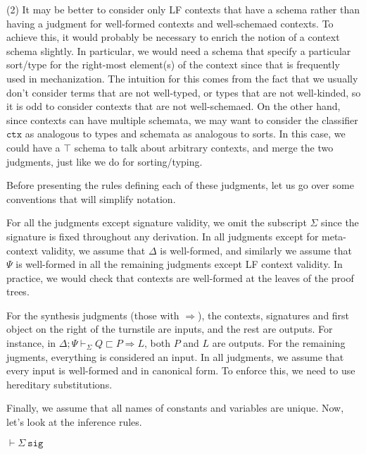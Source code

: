 \documentclass[letterpaper, 11pt]{article}
\newcommand{\Rar}{\Rightarrow}
\newcommand{\sig}{\texttt{sig}}
\begin{document}
    (2) It may be better to consider only LF contexts that have a schema rather than having a judgment for well-formed contexts and well-schemaed contexts.
    To achieve this, it would probably be necessary to enrich the notion of a context schema slightly.  In particular, we would need a schema that
    specify a particular sort/type for the right-most element(s) of the context since that is frequently used in mechanization.  The intuition for this
    comes from the fact that we usually don't consider terms that are not well-typed, or types that are not well-kinded, so it is odd to consider
    contexts that are not well-schemaed.  On the other hand, since contexts can have multiple schemata, we may want to consider the classifier 
    $\texttt{ctx}$ as analogous to types and schemata as analogous to sorts.  In this case, we could have a $\top$ schema to talk about arbitrary contexts,
    and merge the two judgments, just like we do for sorting/typing.

    Before presenting the rules defining each of these judgments, let us go over some conventions that will simplify notation.
    
    For all the judgments except signature validity, we omit the subscript $\Sigma$ since the signature is fixed throughout any derivation.
    In all judgments except for meta-context validity, we assume that $\Delta$ is well-formed, and similarly we assume that $\Psi$ is well-formed 
    in all the remaining judgments except LF context validity.  In practice, we would check that contexts are well-formed at the leaves of
    the proof trees.

    For the synthesis judgments (those with $\Rar$), the contexts, signatures and first object on the right of the turnstile
    are inputs, and the rest are outputs.  For instance, in $ \Delta; \Psi \vdash_\Sigma Q \sqsubset P \Rar L$, both $P$ and $L$ are outputs.
    For the remaining jugments, everything is considered an input.  In all judgments, we assume that every input is well-formed and in canonical form.
    To enforce this, we need to use hereditary substitutions.

    Finally, we assume that all names of constants and variables are unique.  Now, let's look at the inference rules.
    
    $\boxed{\vdash \Sigma \ \sig}$
    
\end{document}
